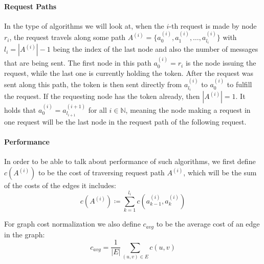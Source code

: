 \documentclass[a4paper, oneside]{discothesis}
\begin{document}
\paragraph{Request Paths} In the type of algorithms we will look at, when the $i$-th request is made by node $r_i$, the request travels along some path $A^{(i)}=\{a^{(i)}_0,a^{(i)}_1,\dots,a^{(i)}_{l_i}\}$ with $l_i=|A^{(i)}|-1$ being the index of the last node and also the number of messages that are being sent. The first node in this path $a^{(i)}_0=r_i$ is the node issuing the request, while the last one is currently holding the token. After the request was sent along this path, the token is then sent directly from $a^{(i)}_{l_i}$ to $a^{(i)}_0$ to fulfill the request. If the requesting node has the token already, then $|A^{(i)}|=1$. It holds that $a^{(i)}_0=a^{(i+1)}_{l_{i+1}}$ for all $i\in\mathbb{N}$, meaning the node making a request in one request will be the last node in the request path of the following request.

\paragraph{Performance}\label{model-perf} In order to be able to talk about performance of such algorithms, we first define $c(A^{(i)})$ to be the cost of traversing request path $A^{(i)}$, which will be the sum of the costs of the edges it includes:
\begin{equation}
c(A^{(i)})\coloneqq\sum_{k=1}^{l_i}c(a^{(i)}_{k-1}, a^{(i)}_k)
\end{equation}

For graph cost normalization we also define $c_{avg}$ to be the average cost of an edge in the graph:
\begin{equation}
c_{avg}=\frac{1}{|E|}\sum_{(u,v)\in E}c(u,v)
\end{equation}
\end{document}
